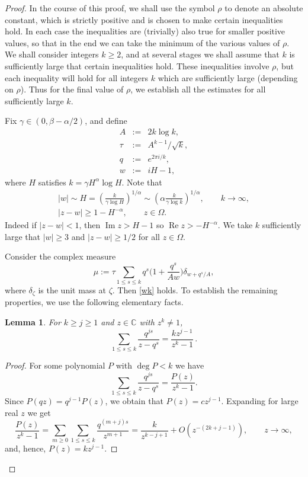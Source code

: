 \documentclass[11pt]{amsart}
\newtheorem{lemma}[theorem]{Lemma}
\theoremstyle{definition}
\theoremstyle{remark}
\numberwithin{equation}{section}
\begin{document}
\begin{proof}  In the course of this proof, we shall use the symbol $\rho$ to denote an absolute constant, which is strictly positive and is chosen to make   certain inequalities hold.  In each case the inequalities are (trivially) also true for smaller positive values, so that in the end we can take the minimum of the various values of $\rho$.  We shall consider integers $k\ge2$, and at several stages we shall assume that $k$ is sufficiently large that certain inequalities hold.  These inequalities involve $\rho$, but each inequality will hold for all integers $k$ which are sufficiently large (depending on $\rho$).  Thus for the final value of $\rho$, we establish all the estimates for all sufficiently large $k$.

Fix $\gamma\in(0,\beta-\alpha/2)$,  and define
\begin{eqnarray}
A&:=&2k\log k, \nonumber \\
\tau&:=&A^{k-1}/\sqrt k, \nonumber \\
q&:=&e^{2\pi i/k}, \nonumber\\
w&:=&iH-1, \label{wH}
\end{eqnarray}
where $H$ satisfies $k=\gamma H^\alpha\log H$.   Note that
\begin{gather}\label{Has}
|w| \sim H = \left( \frac{k}{\gamma \log H} \right)^{1/\alpha} \sim \left(\alpha \frac{k}{\gamma \log k} \right)^{1/\alpha}, \qquad k \to \infty,  \\
  \label{z-w}
|z-w| \ge 1 - H^{-\alpha}, \qquad z \in \Omega.
\end{gather}
Indeed if $|z-w|<1$, then ${\operatorname{Im}} z> H-1$ so ${\operatorname{Re}} z > -H^{-\alpha}$.
We take $k$ sufficiently large that $|w|\ge3$ and $|z-w| \ge 1/2$ for all $z \in \Omega$.

Consider the complex measure
$$
\mu:=\tau\sum_{1 \le s \le k}q^s \Big(1+ \frac{q^s}{Aw}\Big) \delta_{w+q^s/A},
$$
where $\delta_\zeta$ is the unit mass at $\zeta$.  Then \eqref{wk} holds.  To establish the remaining properties, we use the following elementary facts.

\begin{lemma}\label{sub1} For $k\ge j \ge 1$ and $z \in {{\mathbb C}}$ with $z^k\ne1$,
$$
\sum_{1 \le s \le k} \frac{q^{js}}{z -q^s}= \frac{kz^{j-1}}{ z^k-1} \,.
$$
\end{lemma}

\begin{proof}
For some polynomial $P$ with $\operatorname{deg} P < k$
we have
$$
\sum_{1 \le s \le k}\frac{q^{js}}{z-q^s}= \frac {P(z)}{z^k-1}.
$$
Since $P(qz)=q^{j-1}P(z)$, we obtain that $P(z)=c z^{j-1}$.  Expanding for large real $z$ we get
$$
\frac{P(z)}{z^k-1} =  \sum_{m\ge 0}\sum_{1 \le s \le k} \frac{q^{(m+j)s}}{z^{m+1}}=
\frac{k}{z^{k-j+1}} + O\left(z^{-(2k+j-1)}\right),\qquad z\to\infty,
$$
and, hence, $P(z)=kz^{j-1}$.
\end{proof}


\end{proof}
\end{document}
